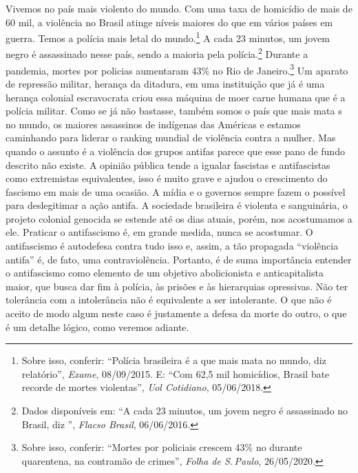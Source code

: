 Vivemos no país mais violento do mundo. Com uma taxa de homicídio de
mais de 60 mil, a violência no Brasil atinge níveis maiores do que em vários
países em guerra. Temos a polícia mais letal do mundo.\footnote{Sobre
  isso, conferir:
  ``Polícia brasileira é a que mais mata no mundo, diz relatório'', \emph{Exame}, 08/09/2015. E: ``Com 62,5 mil homicídios, Brasil bate recorde de mortes violentas'', \emph{Uol Cotidiano}, 05/06/2018.} A cada 23 minutos, um jovem negro é
assassinado nesse país, sendo a maioria pela polícia.\footnote{Dados
  disponíveis em:
  ``A cada 23 minutos, um jovem negro é assassinado no Brasil, diz '', \emph{Flacso Brasil}, 06/06/2016.} Durante a pandemia, mortes por policias
aumentaram 43\% no Rio de Janeiro.\footnote{Sobre isso, conferir:
  ``Mortes por policiais crescem 43\% no  durante quarentena, na contramão de crimes'', \emph{Folha de S.\,Paulo}, 26/05/2020.} Um aparato de repressão militar, herança da
ditadura, em uma instituição que já é uma herança colonial escravocrata
criou essa máquina de moer carne humana que é a polícia militar. Como se
já não bastasse, também somos o país que mais mata s no mundo, os
maiores assassinos de indígenas das Américas e estamos caminhando para
liderar o ranking mundial de violência contra a mulher. Mas quando o
assunto é a violência dos grupos antifas parece que esse pano de
fundo descrito não existe. A opinião pública tende a igualar fascistas e
antifascistas como extremistas equivalentes, isso é muito grave e ajudou
o crescimento do fascismo em mais de uma ocasião. A mídia e o governos
sempre fazem o possível para deslegitimar a ação antifa. A
sociedade brasileira é violenta e sanguinária, o projeto colonial
genocida se estende até os dias atuais, porém, nos acostumamos a ele.
Praticar o antifascismo é, em grande medida, nunca se acostumar. O
antifascismo é autodefesa contra tudo isso e, assim, a tão propagada
``violência antifa'' é, de fato, uma contraviolência. Portanto, é de suma
importância entender o antifascismo como elemento de um objetivo
abolicionista e anticapitalista maior, que busca dar fim à polícia, às
prisões e às hierarquias opressivas. Não ter tolerância com a
intolerância não é equivalente a ser intolerante. O que não é aceito de
modo algum neste caso é justamente a defesa da morte do outro, o que é
um detalhe lógico, como veremos adiante.

